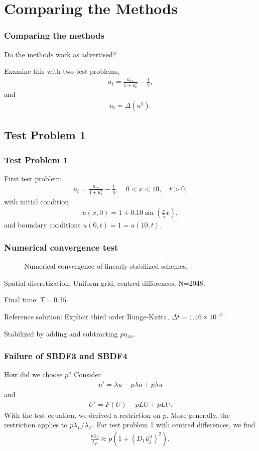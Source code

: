 \documentclass[hyperref={pdfpagelabels=false}]{beamer}
\begin{document}
\section{Comparing the Methods} 
\begin{frame}
	\frametitle{Comparing the methods}
Do the methods work as advertised? 	

Examine this with two test problems,
\begin{align*}
u_t = \frac{u_{xx}}{1 + u_x^2} - \frac{1}{u}, 
\end{align*}
and 
\begin{align*}
u_t = \Delta(u^5).
\end{align*}
\end{frame}

\subsection{Test Problem 1} 
\begin{frame}
	\frametitle{Test Problem 1} 
First test problem: 
\begin{align*}
	u_t = \frac{u_{xx}}{1 + u_x^2} - \frac{1}{u}, 
	\quad 0 < x < 10,\quad t > 0, 
\end{align*}
with initial condition 
\begin{align*}
	u(x,0) = 1 + 0.10\sin\left(\frac{\pi}{5}x \right),
\end{align*}
and boundary conditions $u(0,t) = 1 = u(10,t)$.
\end{frame}
\begin{frame}
	\frametitle{Numerical convergence test}
	\begin{figure}[t]
		\centering
		\caption{Numerical convergence of linearly stabilized schemes.}
	\end{figure}
	Spatial discretization: Uniform grid, centred differences, N=2048.
	
	Final time: $T=0.35$. 
	
	Reference solution: Explicit third order Runge-Kutta, $\Delta t = 1.46\times 10^{-5}$.
	
	Stabilized by adding and subtracting $pu_{xx}$. 	
\end{frame}
\begin{frame}
	\frametitle{Failure of SBDF3 and SBDF4}
	How did we choose $p$? Consider 
\begin{align*}
u' = \lambda u - p\lambda u + p\lambda u
\end{align*}
and 
\begin{align*}
U' = F(U) - pLU + pLU.
\end{align*}
With the test equation, we derived a restriction on $p$. More generally, the restriction applies to $p\lambda_L / \lambda_F$. For test problem 1 with centred differences, we find 
\begin{align*}
\frac{p\lambda_L}{\lambda_F} 
\approx p(1 + (D_1 \bar u^n_j)^2), 
\end{align*}

\end{frame}
\end{document}

